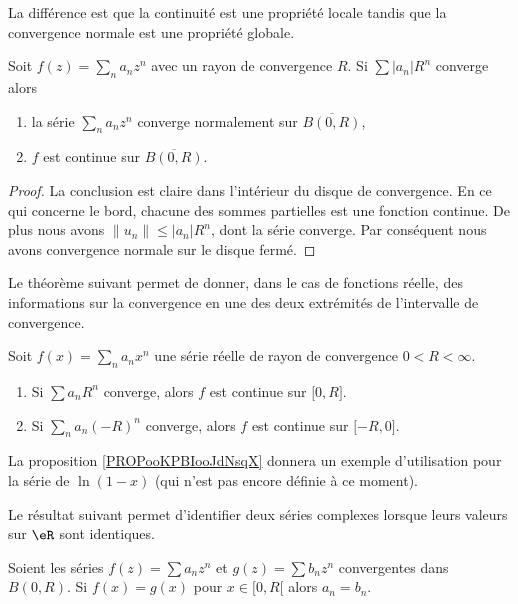 La différence est que la continuité est une propriété locale tandis que la convergence normale est une propriété globale.

\begin{proposition}
	Soit \( f(z)=\sum_na_nz^n\) avec un rayon de convergence \( R\). Si \( \sum | a_n |R^n\) converge alors
	\begin{enumerate}
		\item
		      la série \( \sum_na_nz^n\) converge normalement sur \( \overline{ B(0,R) }\),
		\item
		      \( f\) est continue sur \( \overline{ B(0,R) }\).
	\end{enumerate}
\end{proposition}

\begin{proof}
	La conclusion est claire dans l'intérieur du disque de convergence. En ce qui concerne le bord, chacune des sommes partielles est une fonction continue. De plus nous avons \( \| u_n \|\leq | a_n |R^n\), dont la série converge. Par conséquent nous avons convergence normale sur le disque fermé.
\end{proof}

Le théorème suivant permet de donner, dans le cas de fonctions réelle, des informations sur la convergence en une des deux extrémités de l'intervalle de convergence.
\begin{theorem} \label{ThoLUXVjs}
	Soit \( f(x)=\sum_na_nx^n\) une série réelle de rayon de convergence \( 0<R<\infty\).
	\begin{enumerate}
		\item
		      Si \( \sum a_nR^n\) converge, alors \( f\) est continue sur \( \mathopen[ 0 , R \mathclose]\).
		\item
		      Si \( \sum_na_n(-R)^n\) converge, alors \( f\) est continue sur \( \mathopen[ -R , 0 \mathclose]\).
	\end{enumerate}
\end{theorem}

La proposition \ref{PROPooKPBIooJdNsqX} donnera un exemple d'utilisation pour la série de \( \ln(1-x)\) (qui n'est pas encore définie à ce moment).


Le résultat suivant permet d'identifier deux séries complexes lorsque leurs valeurs sur \( \eR\) sont identiques.
\begin{proposition}		\label{PROPooQLWTooCJYcPl}
	Soient les séries \( f(z)=\sum a_nz^n\) et \( g(z)=\sum b_n z^n\) convergentes dans \( B(0,R)\). Si \( f(x)=g(x)\) pour \( x\in \mathopen[ 0 , R [\) alors \( a_n=b_n\).
\end{proposition}

